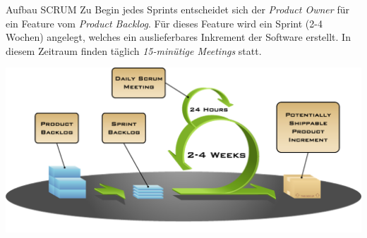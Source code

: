\begin{bonus}{Aufbau SCRUM}
    Zu Begin jedes Sprints entscheidet sich der \emph{Product Owner} für ein Feature vom \emph{Product Backlog}.
    Für dieses Feature wird ein Sprint (2-4 Wochen) angelegt, welches ein auslieferbares Inkrement der Software erstellt.
    In diesem Zeitraum finden täglich \emph{15-minütige Meetings} statt.

    \includegraphics[width=\textwidth]{includes/figures/bonus_SCRUM.png}
\end{bonus}